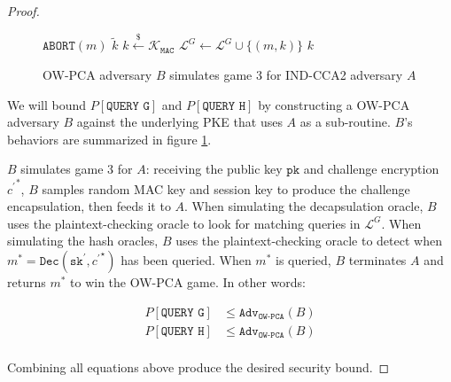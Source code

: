 \documentclass[journal=tches,submission]{iacrtrans}
\newcommand{\decrypt}{\texttt{Dec}}
\newcommand{\mac}{\texttt{MAC}}
\newcommand{\pk}{\texttt{pk}}
\newcommand{\sk}{\texttt{sk}}
\newcommand{\pco}{\texttt{PCO}}
\newcommand{\leftsample}{\stackrel{\$}{\leftarrow}}
\newcommand{\adv}{\texttt{Adv}}
\begin{document}
\begin{proof}
\begin{figure}[h]
\begin{minipage}[t]{0.49\textwidth}
\begin{algorithm}[H]
            \end{algorithm}
            \begin{algorithm}[H]
                \caption*{$\mathcal{O}^G_B(m)$}
                \begin{algorithmic}[1]
                    \If{$\pco(m, {c^\prime}^\ast) = 1$}
                        \State $\texttt{ABORT}(m)$
                    \EndIf
                        \State \Return $\tilde{k}$
                    \EndIf
                    \State $k \leftsample \mathcal{K}_\mac$
                    \State $\mathcal{L}^G \leftarrow \mathcal{L}^G \cup \{(m, k)\}$
                    \State \Return $k$
                \end{algorithmic}
            \end{algorithm}
        \end{minipage}
        \caption{OW-PCA adversary $B$ simulates game 3 for IND-CCA2 adversary $A$}\label{fig:ow-pca-simulates-game-3}
    \end{figure}

    We will bound $P[\texttt{QUERY G}]$ and $P[\texttt{QUERY H}]$ by constructing a OW-PCA adversary $B$ against the underlying PKE that uses $A$ as a sub-routine. $B$'s behaviors are summarized in figure \ref{fig:ow-pca-simulates-game-3}.

    $B$ simulates game 3 for $A$: receiving the public key $\pk$ and challenge encryption ${c^\prime}^\ast$, $B$ samples random MAC key and session key to produce the challenge encapsulation, then feeds it to $A$. When simulating the decapsulation oracle, $B$ uses the plaintext-checking oracle to look for matching queries in $\mathcal{L}^G$. When simulating the hash oracles, $B$ uses the plaintext-checking oracle to detect when $m^\ast = \decrypt(\sk^\prime, {c^\prime}^\star)$ has been queried. When $m^\ast$ is queried, $B$ terminates $A$ and returns $m^\ast$ to win the OW-PCA game. In other words:

    \begin{equation*}
        \begin{aligned}
            P\left[\texttt{QUERY G}\right] &\leq \adv_\texttt{OW-PCA}(B) \\
            P\left[\texttt{QUERY H}\right] &\leq \adv_\texttt{OW-PCA}(B) \\
        \end{aligned}
    \end{equation*}

    Combining all equations above produce the desired security bound.
\end{proof}
\end{document}
